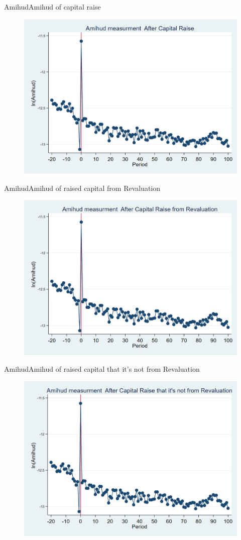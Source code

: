 \documentclass{beamer}
\begin{document}
\begin{frame}{Amihud}{Amihud of capital raise}
\begin{figure}
\centering
\includegraphics[width=0.7\linewidth]{Output/Amihud.png}
\label{fig:amihud}
\end{figure}
\end{frame}



\begin{frame}{Amihud}{Amihud of raised capital from Revaluation}
\begin{figure}
\centering
\includegraphics[width=0.7\linewidth]{Output/Amihud_Revaluation.png}
\label{fig:amihudrevaluation}
\end{figure}
\end{frame}

\begin{frame}{Amihud}{Amihud of raised capital that it's not from Revaluation}
\begin{figure}
\centering
\includegraphics[width=0.7\linewidth]{Output/Amihud_NoRevaluation.png}
\label{fig:amihudnorevaluation}
\end{figure}
\end{frame}
\end{document}
